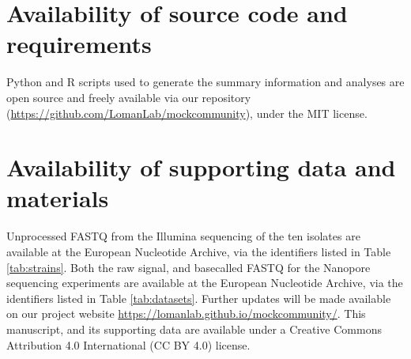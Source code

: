 \documentclass[a4paper,num-refs]{oup-contemporary}
\begin{document}

\section{Availability of source code and requirements}
Python and R scripts used to generate the summary information and analyses are open source and freely available via our repository (\url{https://github.com/LomanLab/mockcommunity}), under the MIT license.



\section{Availability of supporting data and materials}
Unprocessed FASTQ from the Illumina sequencing of the ten isolates are available at the European Nucleotide Archive, via the identifiers listed in Table \ref{tab:strains}. 
Both the raw signal, and basecalled FASTQ for the Nanopore sequencing experiments are available at the European Nucleotide Archive, via the identifiers listed in Table \ref{tab:datasets}.
Further updates will be made available on our project website \url{https://lomanlab.github.io/mockcommunity/}.
This manuscript, and its supporting data are available under a Creative Commons Attribution 4.0 International (CC BY 4.0) license.
\end{document}
